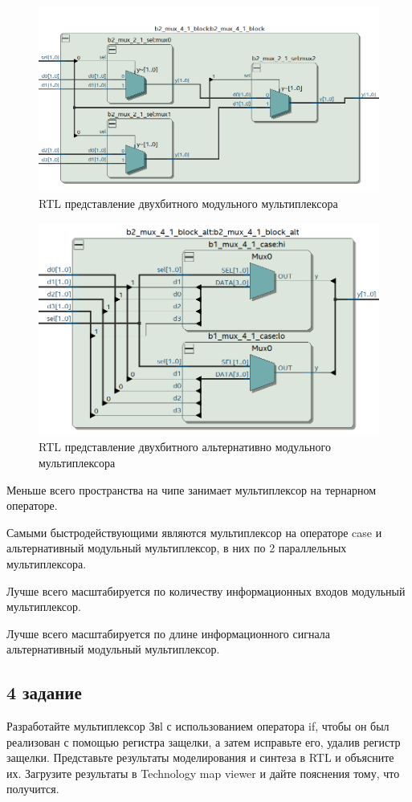 \documentclass[a4paper,14pt]{article}
\begin{document}

\begin{figure}[H]
	\centering
	\includegraphics[width=0.6\linewidth]{img/z3_rtl_block}
	\caption{RTL представление двухбитного модульного мультиплексора }
	\label{fig:z3_rtl_block}
\end{figure}


\begin{figure}[H]
	\centering
	\includegraphics[width=0.6\linewidth]{img/z3_rtl_block_alt}
	\caption{RTL представление двухбитного альтернативно модульного мультиплексора}
	\label{fig:z3_rtl_block_alt}
\end{figure}

Меньше всего пространства на чипе занимает мультиплексор на тернарном операторе.

Самыми быстродействующими являются мультиплексор на операторе case и альтернативный модульный мультиплексор, в них по 2 параллельных мультиплексора.

Лучше всего масштабируется по количеству информационных входов модульный мультиплексор.

Лучше всего масштабируется по длине информационного сигнала альтернативный модульный мультиплексор.

\subsection{4 задание}

Разработайте мультиплексор Звl с использованием оператора if, чтобы он был реализован с помощью регистра защелки, а затем исправьте его, удалив регистр защелки. Представьте результаты моделирования и синтеза в RTL и объясните их. Загрузите результаты в Technology map viewer и дайте пояснения тому, что получится.
\end{document}

